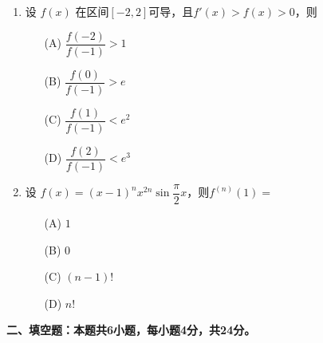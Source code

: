 \documentclass[a4paper,12pt]{article}
\newif\iffirstpage
\begin{document}
\begin{enumerate}
    \item 设 \( f(x) \) 在区间$[-2,2]$可导，且\( f'(x) > f(x) > 0 \)，则 
    \begin{multicols}{4}
        \begin{itemize}
            \item[(A)] $\dfrac{f(-2)}{f(-1)} > 1 $
            \item[(B)] $\dfrac{f(0)}{f(-1)} > e $
            \item[(C)] $\dfrac{f(1)}{f(-1)} < e^2 $
            \item[(D)] $\dfrac{f(2)}{f(-1)} < e^3 $
        \end{itemize}
    \end{multicols}

    \item 设 $f(x)=(x-1)^n x^{2n} \sin{\dfrac{\pi}{2}x}$，则$f^{(n)}(1)=$
    \begin{multicols}{4}
        \begin{itemize}
            \item[(A)] $ 1 $
            \item[(B)] $ 0 $
            \item[(C)] $ (n-1)! $
            \item[(D)] $ n! $
        \end{itemize}
    \end{multicols}


\end{enumerate}



\newpage

\firstpagefalse %



\noindent
\textbf{二、填空题：本题共6小题，每小题4分，共24分。}
\end{document}
